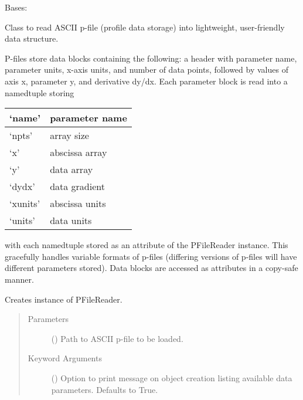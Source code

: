 \documentclass[letterpaper,10pt,english]{sphinxmanual}
\begin{document}
\begin{fulllineitems}
\label{\detokenize{eqtools:eqtools.pfilereader.PFileReader}}
Bases: 

Class to read ASCII p-file (profile data storage) into lightweight,
user-friendly data structure.

P-files store data blocks containing the following: a header with parameter
name, parameter units, x-axis units, and number of data points, followed by
values of axis x, parameter y, and derivative dy/dx.  Each parameter block
is read into a namedtuple storing


\begin{savenotes}\sphinxattablestart
\centering
\begin{tabulary}{\linewidth}[t]{|T|T|}
\hline

‘name’
&
parameter name
\\
\hline
‘npts’
&
array size
\\
\hline
‘x’
&
abscissa array
\\
\hline
‘y’
&
data array
\\
\hline
‘dydx’
&
data gradient
\\
\hline
‘xunits’
&
abscissa units
\\
\hline
‘units’
&
data units
\\
\hline
\end{tabulary}
\par
\sphinxattableend\end{savenotes}

with each namedtuple stored as an attribute of the PFileReader  instance.
This gracefully handles variable formats of p-files (differing versions of
p-files will have different parameters stored).  Data blocks are accessed
as attributes in a copy-safe manner.

Creates instance of PFileReader.
\begin{quote}\begin{description}
\item[{Parameters}] \leavevmode
{} () \textendash{} Path to ASCII p-file to be loaded.

\item[{Keyword Arguments}] \leavevmode
{} () \textendash{} Option to print message on object creation
listing available data parameters. Defaults to True.


\end{description}
\end{quote}
\end{fulllineitems}
\end{document}
